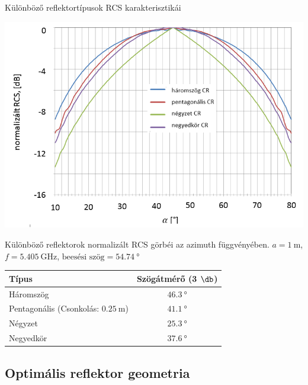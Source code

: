 \documentclass[aspectratio=169]{beamer}
\begin{document}
\begin{frame}{Különböző reflektortípusok RCS karakterisztikái}
    \begin{minipage}[c]{0.55\textwidth}
        \centering
        \includegraphics[width=\textwidth]{reflectors_compare_azimuth.png}
        
        Különböző reflektorok normalizált RCS görbéi az azimuth függvényében. $a = \SI{1}{\meter} $, $f = \SI{5.405}{\giga\hertz}$, $\text{beesési szög} = \SI{54.74}{\degree}$
    \end{minipage}
    \hspace{5pt}
    \begin{minipage}[c]{0.325\textwidth}
        \begin{table}
            \centering
            \begin{tabular}{m{75pt} c} \toprule
                Típus & Szögátmérő (3 $\db$) \\ \midrule
                Háromszög & $\SI{46.3}{\degree}$ \\ \hline
                Pentagonális (Csonkolás: $\SI{0.25}{\meter}$)& $\SI{41.1}{\degree}$ \\ \hline
                Négyzet & $\SI{25.3}{\degree}$ \\ \hline
                Negyedkör & $\SI{37.6}{\degree}$
            \end{tabular}
        \end{table}
    \end{minipage}
\end{frame}

\subsection{Optimális reflektor geometria}
\end{document}
